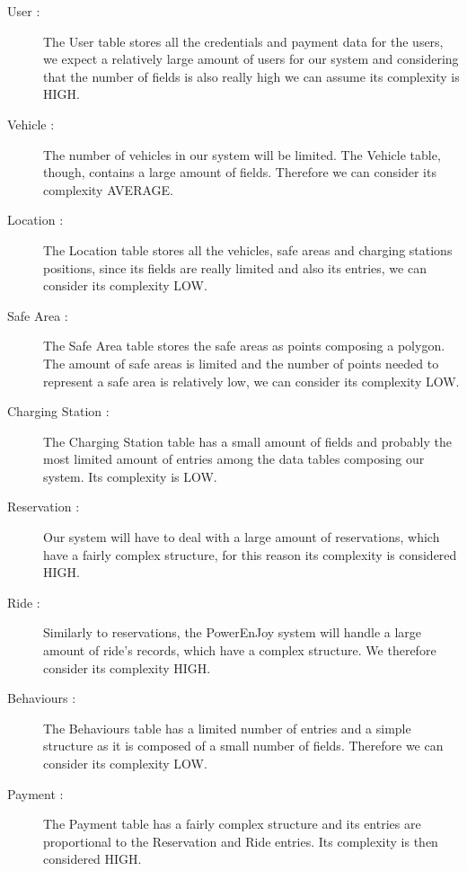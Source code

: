 \begin{description}
	\item [User :] The User table stores all the credentials and payment data for the users, we expect a relatively large amount of users for our system and considering that the number of fields is also really high we can assume its complexity is HIGH.
	\item [Vehicle :] The number of vehicles in our system will be limited. The Vehicle table, though, contains a large amount of fields. Therefore we can consider its complexity AVERAGE.
	\item [Location :] The Location table stores all the vehicles, safe areas and charging stations positions, since its fields are really limited and also its entries, we can consider its complexity LOW.
	\item [Safe Area :] The Safe Area table stores the safe areas as points composing a polygon. The amount of safe areas is limited and the number of points needed to represent a safe area is relatively low, we can consider its complexity LOW.
	\item [Charging Station :] The Charging Station table has a small amount of fields and probably the most limited amount of entries among the data tables composing our system. Its complexity is LOW.
	\item [Reservation :] Our system will have to deal with a large amount of reservations, which have a fairly complex structure, for this reason its complexity is considered HIGH.
	\item [Ride :] Similarly to reservations, the PowerEnJoy system will handle a large amount of ride's records, which have a complex structure. We therefore consider its complexity HIGH.
	\item [Behaviours :] The Behaviours table has a limited number of entries and a simple structure as it is composed of a small number of fields. Therefore we can consider its complexity LOW.
	\item [Payment :] The Payment table has a fairly complex structure and its entries are proportional to the Reservation and Ride entries. Its complexity is then considered HIGH.
\end{description}


